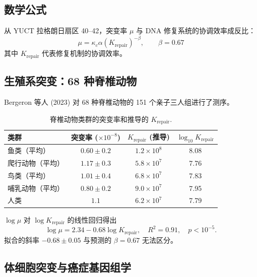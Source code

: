 \documentclass[11pt,a4paper]{article}
\begin{document}
	\subsection{数学公式}
	
	从 YUCT 拉格朗日扇区 40--42，突变率 \(\mu\) 与 DNA 修复系统的协调效率成反比：
	\begin{equation}
		\mu = \kappa_c \alpha \left(K_{\text{repair}}\right)^{-\beta}, \qquad \beta = 0.67
		\label{eq:mutation-rate}
	\end{equation}
	其中 \(K_{\text{repair}}\) 代表修复机制的协调效率。
	
	\subsection{生殖系突变：68 种脊椎动物}
	
	Bergeron 等人 (2023) 对 68 种脊椎动物的 151 个亲子三人组进行了测序。
	
	\begin{table}[H]
		\centering
		\caption{脊椎动物类群的突变率和推导的 \(K_{\text{repair}}\).}
		\label{tab:vertebrate-mutations}
		\begin{tabular}{lccc}
			\toprule
			\textbf{类群} & \textbf{突变率 (\(\times 10^{-8}\))} & \textbf{\(K_{\text{repair}}\) (推导)} & \(\log_{10} K_{\text{repair}}\) \\
			\midrule
			鱼类（平均） & \(0.60 \pm 0.2\) & \(1.2 \times 10^8\) & 8.08 \\
			爬行动物（平均） & \(1.17 \pm 0.3\) & \(5.8 \times 10^7\) & 7.76 \\
			鸟类（平均） & \(1.01 \pm 0.4\) & \(6.8 \times 10^7\) & 7.83 \\
			哺乳动物（平均） & \(0.80 \pm 0.2\) & \(9.0 \times 10^7\) & 7.95 \\
			人类 & \(1.1\) & \(6.2 \times 10^7\) & 7.79 \\
			\bottomrule
		\end{tabular}
	\end{table}
	
	\(\log \mu\) 对 \(\log K_{\text{repair}}\) 的线性回归得出
	\begin{equation}
		\log \mu = 2.34 - 0.68 \log K_{\text{repair}}, \quad R^2 = 0.91, \quad p < 10^{-5}.
		\label{eq:mutation-fit}
	\end{equation}
	拟合的斜率 \(-0.68 \pm 0.05\) 与预测的 \(\beta = 0.67\) 无法区分。
	
	\subsection{体细胞突变与癌症基因组学}
	
\end{document}
